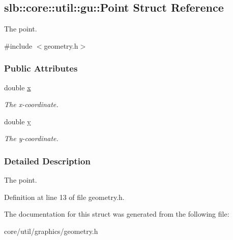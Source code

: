 \hypertarget{structslb_1_1core_1_1util_1_1gu_1_1Point}{}\subsection{slb\+:\+:core\+:\+:util\+:\+:gu\+:\+:Point Struct Reference}
\label{structslb_1_1core_1_1util_1_1gu_1_1Point}


The point.  




{\ttfamily \#include $<$geometry.\+h$>$}

\subsubsection*{Public Attributes}
\begin{DoxyCompactItemize}
\item 
double \hyperlink{structslb_1_1core_1_1util_1_1gu_1_1Point_a018725e001d64dd6f13d4d70572fefe4}{x}\hypertarget{structslb_1_1core_1_1util_1_1gu_1_1Point_a018725e001d64dd6f13d4d70572fefe4}{}\label{structslb_1_1core_1_1util_1_1gu_1_1Point_a018725e001d64dd6f13d4d70572fefe4}

\begin{DoxyCompactList}\small\item\em The x-\/coordinate. \end{DoxyCompactList}\item 
double \hyperlink{structslb_1_1core_1_1util_1_1gu_1_1Point_a0ea9739417d1babfd8a00e2ce692ae43}{y}\hypertarget{structslb_1_1core_1_1util_1_1gu_1_1Point_a0ea9739417d1babfd8a00e2ce692ae43}{}\label{structslb_1_1core_1_1util_1_1gu_1_1Point_a0ea9739417d1babfd8a00e2ce692ae43}

\begin{DoxyCompactList}\small\item\em The y-\/coordinate. \end{DoxyCompactList}\end{DoxyCompactItemize}


\subsubsection{Detailed Description}
The point. 

Definition at line 13 of file geometry.\+h.



The documentation for this struct was generated from the following file\+:\begin{DoxyCompactItemize}
\item 
core/util/graphics/geometry.\+h\end{DoxyCompactItemize}

